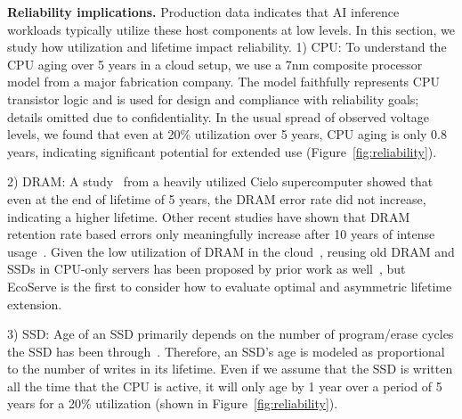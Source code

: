 \textbf{Reliability implications. } Production data indicates that AI inference workloads typically utilize these host components at low levels. 
 In this section, we study how utilization and lifetime impact reliability. 
1) CPU: To understand the CPU aging over 5 years in a cloud setup, we use a 7nm composite processor model from a major fabrication company. The model faithfully represents CPU transistor logic and is used for design and compliance with reliability goals; details omitted due to confidentiality. In the usual spread of observed voltage levels, we found that even at 20\% utilization over 5 years, CPU aging is only 0.8 years, indicating significant potential for extended use (Figure~\ref{fig:reliability}).

2) DRAM: A study~\cite{Siddiqua2017} from a heavily utilized Cielo supercomputer showed that even at the end of lifetime of 5 years, the DRAM error rate did not increase, indicating a higher lifetime. Other recent studies have shown that DRAM retention rate based errors only meaningfully increase after 10 years of intense usage~\cite{liu2022new}. Given the low utilization of DRAM in the cloud~\cite{kanev2015profiling}, reusing old DRAM and SSDs in CPU-only servers has been proposed by prior work as well~\cite{greensku}, but EcoServe is the first to consider how to evaluate optimal and asymmetric lifetime extension. 
 
3) SSD: Age of an SSD primarily depends on the number of program/erase cycles the SSD has been through~\cite{failure-ssd,FlashFailure,schroeder2016flash,klein2021backblaze}. Therefore, an SSD’s age is modeled as proportional to the number of writes in its lifetime. Even if we assume that the SSD is written all the time that the CPU is active, it will only age by 1 year over a period of 5 years for a 20\% utilization (shown in Figure~\ref{fig:reliability}). 
 

